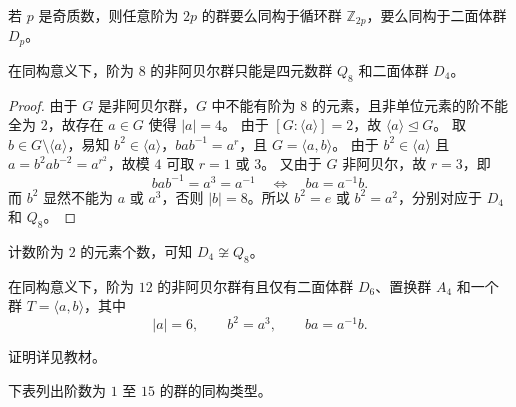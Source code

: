 \begin{corollary}\label{cor:groups-of-order-twice-odd-prime}
若 $p$ 是奇质数，则任意阶为 $2p$ 的群要么同构于循环群 $\mathbb Z_{2p}$，要么同构于二面体群 $D_p$。
\end{corollary}

\begin{proposition}\label{prop:nonabelian-groups-of-order-eight}
在同构意义下，阶为 $8$ 的非阿贝尔群只能是四元数群 $Q_8$ 和二面体群 $D_4$。
\end{proposition}

\begin{proof}
由于 $G$ 是非阿贝尔群，$G$ 中不能有阶为 $8$ 的元素，且非单位元素的阶不能全为 $2$，故存在 $a\in G$ 使得 $|a|=4$。
由于 $[G:\langle a\rangle]=2$，故 $\langle a\rangle\trianglelefteq G$。
取 $b\in G\setminus\langle a\rangle$，易知 $b^2\in\langle a\rangle$，$bab^{-1}=a^r$，且 $G=\langle a,b\rangle$。
由于 $b^2\in\langle a\rangle$ 且 $a=b^2ab^{-2}=a^{r^2}$，故模 $4$ 可取 $r=1$ 或 $3$。
又由于 $G$ 非阿贝尔，故 $r=3$，即
\[
  bab^{-1}=a^3=a^{-1}\quad\Longleftrightarrow\quad ba=a^{-1}b.
\]
而 $b^2$ 显然不能为 $a$ 或 $a^3$，否则 $|b|=8$。所以 $b^2=e$ 或 $b^2=a^2$，分别对应于 $D_4$ 和 $Q_8$。
\end{proof}

\begin{purplenote}
计数阶为 $2$ 的元素个数，可知 $D_4\not\cong Q_8$。
\end{purplenote}

\begin{proposition}\label{prop:nonabelian-groups-of-order-twelve}
在同构意义下，阶为 $12$ 的非阿贝尔群有且仅有二面体群 $D_6$、置换群 $A_4$ 和一个群 $T=\langle a,b\rangle$，其中
\[
  |a|=6,\qquad b^2=a^3,\qquad ba=a^{-1}b.
\]
\end{proposition}

\begin{purplenote}
证明详见教材。
\end{purplenote}

下表列出阶数为 $1$ 至 $15$ 的群的同构类型。

